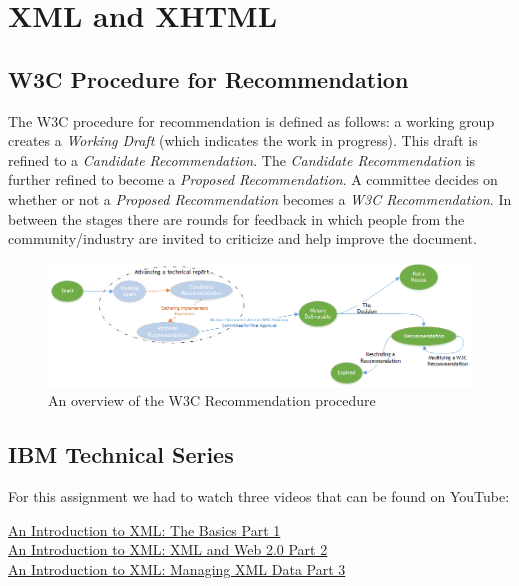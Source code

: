 
\section{XML and XHTML}

\subsection{W3C Procedure for Recommendation}

The W3C procedure for recommendation is defined as follows: a working group creates a \textit{Working Draft} (which indicates the work in progress). This draft is refined to a \textit{Candidate Recommendation}. The \textit{Candidate Recommendation} is further refined to become a \textit{Proposed Recommendation}. A committee decides on whether or not a \textit{Proposed Recommendation} becomes a \textit{W3C Recommendation}. In between the stages there are rounds for feedback in which people from the community/industry are invited to criticize and help improve the document.

\vspace{10pt}

\begin{figure}[here]
	\centering
	\includegraphics[width=1.0\textwidth]{images/w3c.png}
	\caption{An overview of the W3C Recommendation procedure}
	\label{fig:RecommendationProcedure}
\end{figure}

\subsection{IBM Technical Series}

For this assignment we had to watch three videos that can be found on YouTube:

\href{http://www.youtube.com/watch?v=Q0k5ySZGPBc}{An Introduction to XML: The Basics Part 1} \\
\href{http://www.youtube.com/watch?v=16q5bbeO3xI}{An Introduction to XML: XML and Web 2.0 Part 2} \\
\href{http://www.youtube.com/watch?v=Q0k5ySZGPBc}{An Introduction to XML: Managing XML Data Part 3} \\

